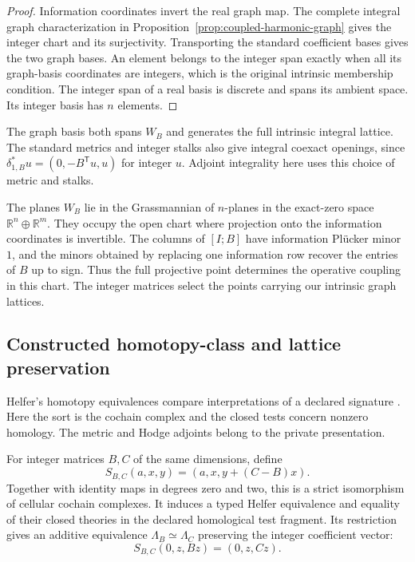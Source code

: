 \begin{proof}
Information coordinates invert the real graph map. The complete integral
graph characterization in Proposition~\ref{prop:coupled-harmonic-graph}
gives the integer chart and its surjectivity. Transporting the standard
coefficient bases gives the two graph bases. An element belongs to the
integer span exactly when all its graph-basis coordinates are integers,
which is the original intrinsic membership condition. The integer span of
a real basis is discrete and spans its ambient space. Its integer basis has
\(n\) elements.
\end{proof}



The graph basis both spans \(W_B\) and generates the full intrinsic integral
lattice. The standard metrics and integer stalks also give integral
coexact openings, since \(\delta_{1,B}^*u=(0,-B^{\mathsf T}u,u)\) for
integer \(u\). Adjoint integrality here uses this choice of metric and
stalks.

The planes \(W_B\) lie in the Grassmannian of \(n\)-planes in the exact-zero
space \(\mathbb R^n\oplus\mathbb R^m\). They occupy the open chart where
projection onto the information coordinates is invertible. The columns of
\([I;B]\) have information Pl\"ucker minor \(1\), and the minors obtained by
replacing one information row recover the entries of \(B\) up to sign. Thus
the full projective point determines the operative coupling in this chart.
The integer matrices select the points carrying our intrinsic graph lattices.

\subsection{Constructed homotopy-class and lattice preservation}

Helfer's homotopy equivalences compare interpretations of a declared
signature \cite[Definition~7.1]{helfer2019fol}. Here the sort is the cochain
complex and the closed tests concern nonzero homology. The metric and Hodge
adjoints belong to the private presentation.

\begin{theorem}
\label{thm:coupled-public-class}
For integer matrices \(B,C\) of the same dimensions, define
\[
 S_{B,C}(a,x,y)=(a,x,y+(C-B)x).
\]
Together with identity maps in degrees zero and two, this is a strict
isomorphism of cellular cochain complexes. It induces a
typed Helfer equivalence and equality of their closed theories in the declared
homological test fragment. Its restriction gives an additive equivalence
\(\Lambda_B\simeq\Lambda_C\) preserving the integer coefficient vector:
\[
 S_{B,C}(0,z,Bz)=(0,z,Cz).
\]
\end{theorem}


